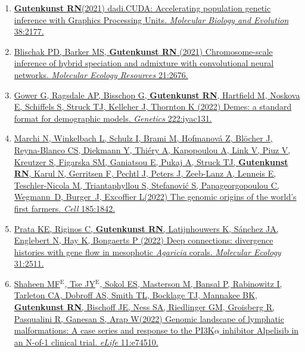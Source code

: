 \documentclass[11pt]{article}
\begin{document}
\begin{enumerate}
\item \href{https://doi.org/10.1093/molbev/msaa305}{\textbf{Gutenkunst RN}\corresponding (2021) dadi.CUDA: Accelerating population genetic inference with Graphics Processing Units. \emph{Molecular Biology and Evolution} 38:2177.}

\item \href{https://doi.org/10.1111/1755-0998.13355}{Blischak PD\trainee\corresponding, Barker MS, \textbf{Gutenkunst RN} (2021) Chromosome-scale inference of hybrid speciation and admixture with convolutional neural networks. \emph{Molecular Ecology Resources} 21:2676.}

\item \href{https://doi.org/10.1093/genetics/iyac131}{Gower G\equal, Ragsdale AP\equal, Bisschop G, \textbf{Gutenkunst RN}, Hartfield M, Noskova E, Schiffels S, Struck TJ\trainee, Kelleher J\corresponding, Thornton K (2022) Demes: a standard format for demographic models. \emph{Genetics} 222:iyac131.}

\item \href{https://doi.org/10.1016/j.cell.2022.04.008}{Marchi N\equal, Winkelbach L\equal, Schulz I\equal, Brami M\equal, Hofmanov\'a Z, Bl\"ocher J,
Reyna-Blanco CS, Diekmann Y, Thi\'ery A, Kapopoulou A, Link V, Piuz V, Kreutzer S, Figarska SM, Ganiatsou E, Pukaj A, Struck TJ\trainee, \textbf{Gutenkunst RN}, Karul N, Gerritsen F, Pechtl J, Peters J, Zeeb-Lanz A,
Lenneis E, Teschler-Nicola M, Triantaphyllou S, Stefanovi\'c S, Papageorgopoulou C, Wegmann~D\corresponding, Burger~J\corresponding, Excoffier L\corresponding (2022)
The genomic origins of the world’s first farmers. \emph{Cell} 185:1842.}

\item \href{https://doi.org/10.1111/mec.16391}{Prata KE\corresponding, Riginos C, \textbf{Gutenkunst RN}, Latijnhouwers K, Sánchez JA, Englebert N, Hay K, Bongaerts P (2022) Deep connections: divergence histories with gene flow in mesophotic \emph{Agaricia} corals. \emph{Molecular Ecology} 31:2511.}

\item \href{https://doi.org/10.7554/eLife.74510}{Shaheen MF$^\mathrm{E}$\corresponding, Tse JY$^\mathrm{E}$\corresponding, Sokol ES, Masterson M, Bansal P, Rabinowitz I, Tarleton CA, Dobroff AS, Smith TL, Bocklage TJ, Mannakee BK\trainee, \textbf{Gutenkunst RN}, Bischoff JE, Ness SA, Riedlinger GM, Groisberg R, Pasqualini R, Ganesan S\corresponding, Arap W\corresponding (2022)
Genomic landscape of lymphatic malformations: A case series and response to the PI3K$\alpha$ inhibitor Alpelisib in an N-of-1 clinical trial. \emph{eLife} 11:e74510.}


\end{enumerate}
\end{document}
